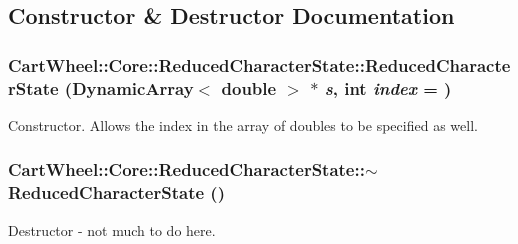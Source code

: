 \subsection{Constructor \& Destructor Documentation}
\hypertarget{classCartWheel_1_1Core_1_1ReducedCharacterState_a6c252498e0bbab7da8c1fcfe4df3b84b}{
\subsubsection[{ReducedCharacterState}]{\setlength{\rightskip}{0pt plus 5cm}CartWheel::Core::ReducedCharacterState::ReducedCharacterState (DynamicArray$<$ double $>$ $\ast$ {\em s}, \/  int {\em index} = {})}}
\label{classCartWheel_1_1Core_1_1ReducedCharacterState_a6c252498e0bbab7da8c1fcfe4df3b84b}
Constructor. Allows the index in the array of doubles to be specified as well. \hypertarget{classCartWheel_1_1Core_1_1ReducedCharacterState_ae99e3ea594b4b147c33572723944a59b}{
\subsubsection[{$\sim$ReducedCharacterState}]{\setlength{\rightskip}{0pt plus 5cm}CartWheel::Core::ReducedCharacterState::$\sim$ReducedCharacterState ()}}
\label{classCartWheel_1_1Core_1_1ReducedCharacterState_ae99e3ea594b4b147c33572723944a59b}
Destructor -\/ not much to do here. 

